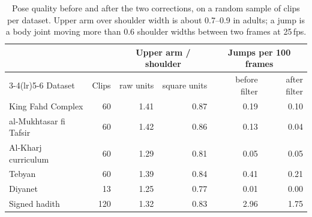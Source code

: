 \begin{table}[ht]
\centering
\small
\caption{Pose quality before and after the two corrections, on a random sample of clips per dataset. Upper arm over shoulder width is about 0.7--0.9 in adults; a jump is a body joint moving more than 0.6 shoulder widths between two frames at 25\,fps.}
\label{tab:pose_qa}
\begin{tabular}{lrrrrr}
\toprule
& & \multicolumn{2}{c}{Upper arm / shoulder} & \multicolumn{2}{c}{Jumps per 100 frames} \\
\cmidrule(lr){3-4}\cmidrule(lr){5-6}
Dataset & Clips & raw units & square units & before filter & after filter \\
\midrule
King Fahd Complex & 60 & 1.41 & 0.87 & 0.19 & 0.10 \\
al-Mukhtasar fi Tafsir & 60 & 1.42 & 0.86 & 0.13 & 0.04 \\
Al-Kharj curriculum & 60 & 1.29 & 0.81 & 0.05 & 0.05 \\
Tebyan & 60 & 1.39 & 0.84 & 0.41 & 0.21 \\
Diyanet & 13 & 1.25 & 0.77 & 0.01 & 0.00 \\
Signed hadith & 120 & 1.32 & 0.83 & 2.96 & 1.75 \\
\bottomrule
\end{tabular}
\end{table}
